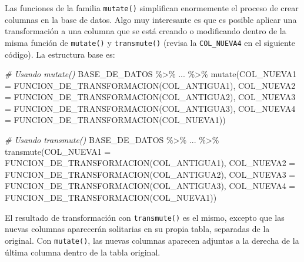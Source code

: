 \documentclass[
]{article}
\newenvironment{Shaded}{\begin{snugshade}}{\end{snugshade}}
\newcommand{\AttributeTok}[1]{\textcolor[rgb]{0.77,0.63,0.00}{#1}}
\newcommand{\CommentTok}[1]{\textcolor[rgb]{0.56,0.35,0.01}{\textit{#1}}}
\newcommand{\FunctionTok}[1]{\textcolor[rgb]{0.00,0.00,0.00}{#1}}
\newcommand{\NormalTok}[1]{#1}
\newcommand{\SpecialCharTok}[1]{\textcolor[rgb]{0.00,0.00,0.00}{#1}}
\theoremstyle{definition}
\theoremstyle{definition}
\theoremstyle{definition}
\theoremstyle{definition}
\theoremstyle{remark}
\begin{document}
Las funciones de la familia \texttt{mutate()} simplifican enormemente el proceso de crear columnas en la base de datos. Algo muy interesante es que es posible aplicar una transformación a una columna que se está creando o modificando dentro de la misma función de \texttt{mutate()} y \texttt{transmute()} (revisa la \texttt{COL\_NUEVA4} en el siguiente código). La estructura base es:

\begin{Shaded}
\begin{Highlighting}[]
\CommentTok{\# Usando mutate()}
\NormalTok{BASE\_DE\_DATOS }\SpecialCharTok{\%\textgreater{}\%}\NormalTok{ ... }\SpecialCharTok{\%\textgreater{}\%} 
  \FunctionTok{mutate}\NormalTok{(}\AttributeTok{COL\_NUEVA1 =} \FunctionTok{FUNCION\_DE\_TRANSFORMACION}\NormalTok{(COL\_ANTIGUA1),}
         \AttributeTok{COL\_NUEVA2 =} \FunctionTok{FUNCION\_DE\_TRANSFORMACION}\NormalTok{(COL\_ANTIGUA2),}
         \AttributeTok{COL\_NUEVA3 =} \FunctionTok{FUNCION\_DE\_TRANSFORMACION}\NormalTok{(COL\_ANTIGUA3),}
         \AttributeTok{COL\_NUEVA4 =} \FunctionTok{FUNCION\_DE\_TRANSFORMACION}\NormalTok{(COL\_NUEVA1))}

\CommentTok{\# Usando transmute()}
\NormalTok{BASE\_DE\_DATOS }\SpecialCharTok{\%\textgreater{}\%}\NormalTok{ ... }\SpecialCharTok{\%\textgreater{}\%} 
  \FunctionTok{transmute}\NormalTok{(}\AttributeTok{COL\_NUEVA1 =} \FunctionTok{FUNCION\_DE\_TRANSFORMACION}\NormalTok{(COL\_ANTIGUA1),}
         \AttributeTok{COL\_NUEVA2 =} \FunctionTok{FUNCION\_DE\_TRANSFORMACION}\NormalTok{(COL\_ANTIGUA2),}
         \AttributeTok{COL\_NUEVA3 =} \FunctionTok{FUNCION\_DE\_TRANSFORMACION}\NormalTok{(COL\_ANTIGUA3),}
         \AttributeTok{COL\_NUEVA4 =} \FunctionTok{FUNCION\_DE\_TRANSFORMACION}\NormalTok{(COL\_NUEVA1))}
\end{Highlighting}
\end{Shaded}

\begin{rmdtip}
El resultado de transformación con \texttt{transmute()} es el mismo, excepto que las nuevas columnas aparecerán solitarias en su propia tabla, separadas de la original. Con \texttt{mutate()}, las nuevas columnas aparecen adjuntas a la derecha de la última columna dentro de la tabla original.
\end{rmdtip}
\end{document}
